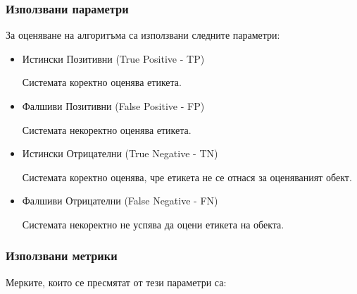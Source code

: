 \documentclass{article}
\begin{document}
\subsubsection{Използвани параметри}

За оценяване на алгоритъма са използвани следните параметри:

\begin{itemize}

  \item Истински Позитивни (True Positive - TP)

  Системата коректно оценява етикета.

  \item Фалшиви Позитивни (False Positive - FP)

  Системата некоректно оценява етикета.

  \item Истински Отрицателни (True Negative - TN)

  Системата коректно оценява, чре етикета не се отнася за оценяваният обект.

  \item Фалшиви Отрицателни (False Negative - FN)

  Системата некоректно не успява да оцени етикета на обекта. \cite{intro-to-nlp-mit}

\end{itemize}

\subsubsection{Използвани метрики}

Мерките, които се пресмятат от тези параметри са:
\end{document}
